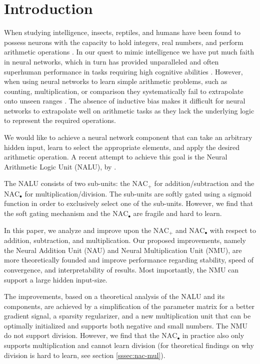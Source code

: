 \section{Introduction}
When studying intelligence, insects, reptiles, and humans have been found to possess neurons with the capacity to hold integers, real numbers, and perform arithmetic operations \cite{nieder-neuronal-number,rugani-arithmetic-chicks,gallistel-numbers-in-brain}.
In our quest to mimic intelligence we have put much faith in neural networks, which in turn has provided unparalleled and often superhuman performance in tasks requiring high cognitive abilities \cite{natureGo,bert,openai-learning-dexterous}.
However, when using neural networks to learn simple arithmetic problems, such as counting, multiplication, or comparison they systematically fail to extrapolate onto unseen ranges \cite{stillNotSystematic,suzgun2019evaluating,trask-nalu}.
The absence of inductive bias makes it difficult for neural networks to extrapolate well on arithmetic tasks as they lack the underlying logic to represent the required operations.

We would like to achieve a neural network component that can take an arbitrary hidden input, learn to select the appropriate elements, and apply the desired arithmetic operation.
A recent attempt to achieve this goal is the Neural Arithmetic Logic Unit (NALU), by \citet{trask-nalu}.

The NALU consists of two sub-units: the $\text{NAC}_{+}$ for addition/subtraction and the $\text{NAC}_{\bullet}$ for multiplication/division.
The sub-units are softly gated using a sigmoid function in order to exclusively select one of the sub-units.
However, we find that the soft gating mechanism and the $\text{NAC}_{\bullet}$ are fragile and hard to learn.

In this paper, we analyze and improve upon the $\text{NAC}_{+}$ and $\text{NAC}_{\bullet}$ with respect to addition, subtraction, and multiplication.
Our proposed improvements, namely the Neural Addition Unit (NAU) and Neural Multiplication Unit (NMU), are more theoretically founded and improve performance regarding stability, speed of convergence, and interpretability of results.
Most importantly, the NMU can support a large hidden input-size.

The improvements, based on a theoretical analysis of the NALU and its components, are achieved by a simplification of the parameter matrix for a better gradient signal, a sparsity regularizer, and a new multiplication unit that can be optimally initialized and supports both negative and small numbers.
The NMU do not support division.
However, we find that the $\text{NAC}_{\bullet}$ in practice also only supports multiplication and cannot learn division (for theoretical findings on why division is hard to learn, see section \ref{sssec:nac-mul}).

